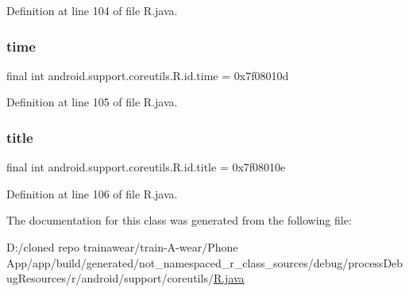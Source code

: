 Definition at line 104 of file R.\+java.

\mbox{\label{classandroid_1_1support_1_1coreutils_1_1_r_1_1id_ad7a7e56ee49aaa67d17b3cb87cf684b2}} 
\subsubsection{\texorpdfstring{time}{time}}
{\footnotesize\ttfamily final int android.\+support.\+coreutils.\+R.\+id.\+time = 0x7f08010d\hspace{0.3cm}{\ttfamily [static]}}



Definition at line 105 of file R.\+java.

\mbox{\label{classandroid_1_1support_1_1coreutils_1_1_r_1_1id_ab9de2d4e17927fd3cbb3594914b602ea}} 
\subsubsection{\texorpdfstring{title}{title}}
{\footnotesize\ttfamily final int android.\+support.\+coreutils.\+R.\+id.\+title = 0x7f08010e\hspace{0.3cm}{\ttfamily [static]}}



Definition at line 106 of file R.\+java.



The documentation for this class was generated from the following file\+:\begin{DoxyCompactItemize}
\item 
D\+:/cloned repo trainawear/train-\/\+A-\/wear/\+Phone App/app/build/generated/not\+\_\+namespaced\+\_\+r\+\_\+class\+\_\+sources/debug/process\+Debug\+Resources/r/android/support/coreutils/\mbox{\hyperlink{process_debug_resources_2r_2android_2support_2coreutils_2_r_8java}{R.\+java}}\end{DoxyCompactItemize}
